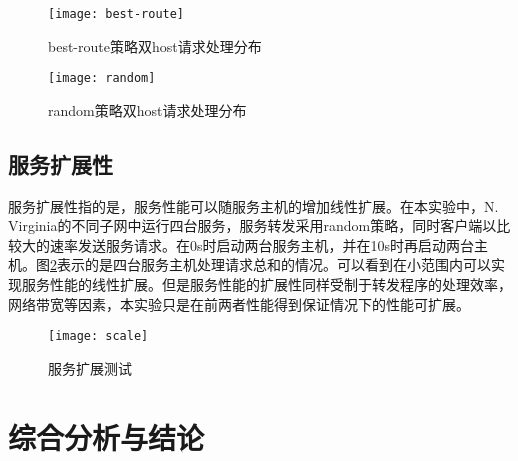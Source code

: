 \begin{figure}[H]
\begin{minipage}[t]{0.5\linewidth}
\centering
\texttt{[image: best-route]}
\caption{best-route策略双host请求处理分布}
\label{fig:strategy:best-route}
\end{minipage}%
\begin{minipage}[t]{0.5\linewidth}
\centering
\texttt{[image: random]}
\caption{random策略双host请求处理分布}
\label{fig:strategy:random}
\end{minipage}
\end{figure}

\subsection{服务扩展性}
服务扩展性指的是，服务性能可以随服务主机的增加线性扩展。在本实验中，N. Virginia的不同子网中运行四台服务，服务转发采用random策略，同时客户端以比较大的速率发送服务请求。在0s时启动两台服务主机，并在10s时再启动两台主机。图\ref{fig:scale}表示的是四台服务主机处理请求总和的情况。可以看到在小范围内可以实现服务性能的线性扩展。但是服务性能的扩展性同样受制于转发程序的处理效率，网络带宽等因素，本实验只是在前两者性能得到保证情况下的性能可扩展。

\begin{figure}[H]
  \centering
  \texttt{[image: scale]}
  \caption{服务扩展测试}
  \label{fig:scale}
\end{figure}

\section{综合分析与结论}
